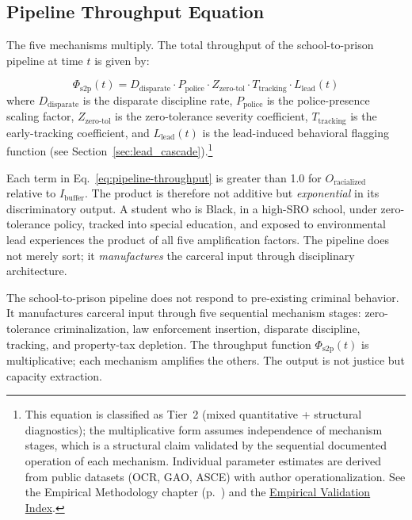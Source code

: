 \subsection{Pipeline Throughput Equation}

The five mechanisms multiply. The total throughput of the school-to-prison pipeline at time $t$ is given by:

\begin{equation}\label{eq:pipeline-throughput}
\Phi_{\text{s2p}}(t) = D_{\text{disparate}} \cdot P_{\text{police}} \cdot Z_{\text{zero-tol}} \cdot T_{\text{tracking}} \cdot L_{\text{lead}}(t)
\end{equation}
where $D_{\text{disparate}}$ is the disparate discipline rate, $P_{\text{police}}$ is the police-presence scaling factor, $Z_{\text{zero-tol}}$ is the zero-tolerance severity coefficient, $T_{\text{tracking}}$ is the early-tracking coefficient, and $L_{\text{lead}}(t)$ is the lead-induced behavioral flagging function (see Section~\ref{sec:lead_cascade}).\footnote{This equation is classified as Tier~2 (mixed quantitative + structural diagnostics); the multiplicative form assumes independence of mechanism stages, which is a structural claim validated by the sequential documented operation of each mechanism. Individual parameter estimates are derived from public datasets (OCR, GAO, ASCE) with author operationalization. See the Empirical Methodology chapter (p.~\pageref{ch:empirical_methodology}) and the \hyperref[app:empirical_index]{Empirical Validation Index}.}

Each term in Eq.~\ref{eq:pipeline-throughput} is greater than 1.0 for $O_{\text{racialized}}$ relative to $I_{\text{buffer}}$. The product is therefore not additive but \textit{exponential} in its discriminatory output. A student who is Black, in a high-SRO school, under zero-tolerance policy, tracked into special education, and exposed to environmental lead experiences the product of all five amplification factors. The pipeline does not merely sort; it \textit{manufactures} the carceral input through disciplinary architecture.

\begin{keyinsight}
The school-to-prison pipeline does not respond to pre-existing criminal behavior. It manufactures carceral input through five sequential mechanism stages: zero-tolerance criminalization, law enforcement insertion, disparate discipline, tracking, and property-tax depletion. The throughput function $\Phi_{\text{s2p}}(t)$ is multiplicative; each mechanism amplifies the others. The output is not justice but capacity extraction.
\end{keyinsight}

